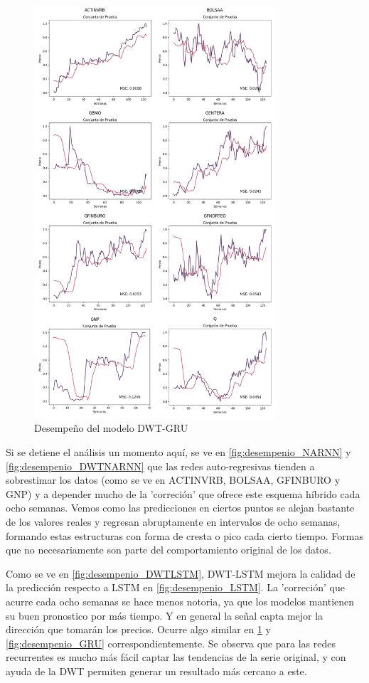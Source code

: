 \begin{figure}[H]
    \centering
    \includegraphics[width=0.8\textwidth]{Figuras/analisis/DWT_GRU.png}
    \caption{Desempeño del modelo DWT-GRU} 
    \label{fig:desempenio_DWTGRU}
\end{figure}

Si se detiene el análisis un momento aquí, se ve en \ref{fig:desempenio_NARNN} y \ref{fig:desempenio_DWTNARNN} que las redes auto-regresivas tienden a sobrestimar los datos (como se ve en ACTINVRB, BOLSAA, GFINBURO y GNP) y a depender mucho de la 'correción' que ofrece este esquema híbrido cada ocho semanas. Vemos como las predicciones en ciertos puntos se alejan bastante de los valores reales y regresan abruptamente en intervalos de ocho semanas, formando estas estructuras con forma de cresta o pico cada cierto tiempo. Formas que no necesariamente son parte del comportamiento original de los datos.

Como se ve en \ref{fig:desempenio_DWTLSTM}, DWT-LSTM mejora la calidad de la predicción respecto a LSTM en \ref{fig:desempenio_LSTM}. La 'correción' que acurre cada ocho semanas se hace menos notoria, ya que los modelos mantienen su buen pronostico por más tiempo. Y en general la señal capta mejor la dirección que tomarán los precios. Ocurre algo similar en \ref{fig:desempenio_DWTGRU} y \ref{fig:desempenio_GRU} correspondientemente. Se observa que para las redes recurrentes es mucho más fácil captar las tendencias de la serie original, y con ayuda de la DWT permiten generar un resultado más cercano a este.


